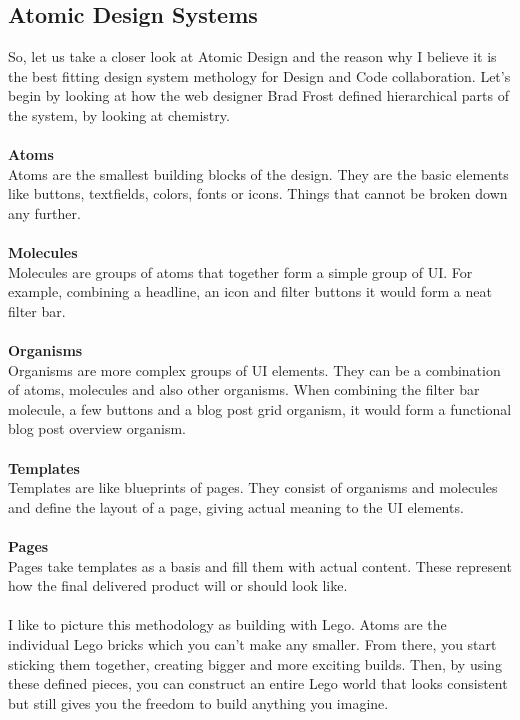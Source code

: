 \newpage
\subsection{Atomic Design Systems}
So, let us take a closer look at Atomic Design and the reason why I believe it is the best fitting
design system methology for Design and Code collaboration. Let's begin by looking at how the web
designer Brad Frost defined hierarchical parts of the system, by looking at chemistry. \\\\
\textbf{Atoms} \\
Atoms are the smallest building blocks of the design. They are the basic elements like buttons,
textfields, colors, fonts or icons. Things that cannot be broken down any further. \\\\
\textbf{Molecules} \\
Molecules are groups of atoms that together form a simple group of UI. For example, combining
a headline, an icon and filter buttons it would form a neat filter bar. \\\\
\textbf{Organisms} \\
Organisms are more complex groups of UI elements. They can be a combination of atoms, molecules and
also other organisms. When combining the filter bar molecule, a few buttons and a blog post grid
organism, it would form a functional blog post overview organism. \\\\
\textbf{Templates} \\
Templates are like blueprints of pages. They consist of organisms and molecules and define the
layout of a page, giving actual meaning to the UI elements. \\\\
\textbf{Pages}\\
Pages take templates as a basis and fill them with actual content. These represent how the final
delivered product will or should look like. \\
\\

I like to picture this methodology as building with Lego. Atoms are the individual Lego bricks
which you can't make any smaller. From there, you start sticking them together,
creating bigger and more exciting builds. Then, by using these defined pieces, you can construct an entire
Lego world that looks consistent but still gives you the freedom to build anything you imagine.

